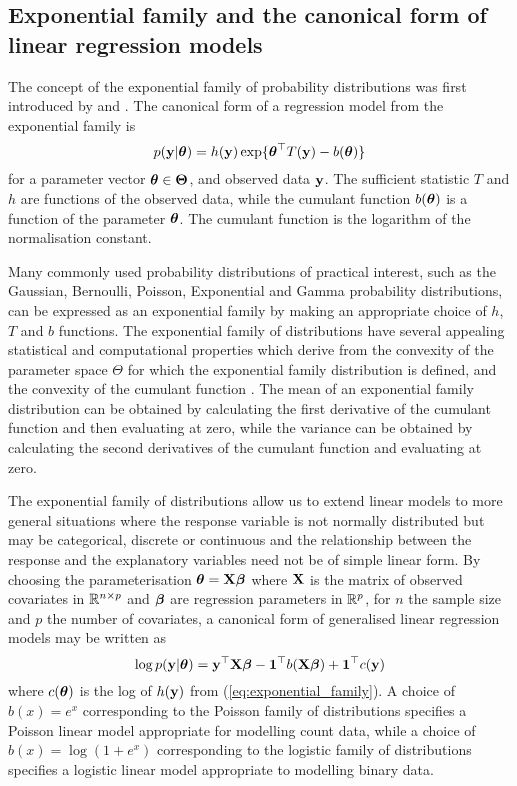 \subsection{Exponential family and the canonical form of linear regression
models}

The concept of the exponential family of probability distributions was first
introduced by \cite{Koopman1935} and \cite{pitman_1936}. The canonical form of a
regression model from the exponential family is
\begin{equation}\label{eq:exponential_family}
	p({\bf y} | {\boldsymbol \theta}) = h({\bf y}) \exp \{ {\boldsymbol \theta}^\top T({\bf y}) - b({\boldsymbol \theta}) \}
\end{equation}
for a parameter vector ${\boldsymbol \theta} \in \mathbf{\Theta}$, and observed data ${\bf y}$.
The sufficient statistic $T$ and $h$ are functions of the observed data, while
the cumulant function $b({\boldsymbol \theta})$ is a function of the parameter ${\boldsymbol \theta}$. The
cumulant function is the logarithm of the normalisation constant.

Many commonly used probability distributions of practical interest, such as the
Gaussian, Bernoulli, Poisson, Exponential and Gamma probability distributions,
can be expressed as an exponential family by making an appropriate choice of
$h$, $T$ and $b$ functions. The exponential family of distributions have several
appealing statistical and computational properties which derive from the
convexity of the parameter space $\Theta$ for which the exponential family
distribution is defined, and the convexity of the cumulant function
\cite{Jordan2010}. The mean of an exponential family distribution can be
obtained by calculating the first derivative of the cumulant function and then
evaluating at zero, while the variance can be obtained by calculating the second
derivatives of the cumulant function and evaluating at zero.

The exponential family of distributions allow us to extend linear models to more
general situations where the response variable is not normally distributed but
may be categorical, discrete or continuous and the relationship between the
response and the explanatory variables need not be of simple linear form.  By
choosing the parameterisation ${\boldsymbol \theta} = {\bf X} {\boldsymbol \beta}$ where ${\bf X}$ is the matrix
of observed covariates in ${\mathbb{R}}^{n \times p}$ and ${\boldsymbol \beta}$ are regression
parameters in ${\mathbb{R}}^p$, for $n$ the sample size and $p$ the number of covariates,
a canonical form of generalised linear regression models may be written as
\begin{equation}\label{eq:glm}
	\log p({\bf y} | {\boldsymbol \theta}) = {\bf y}^\top {\bf X} {\boldsymbol\beta} - {\bf 1}^\top b({\bf X} {\boldsymbol \beta}) + {\bf 1}^\top c({\bf y})
\end{equation}
where $c({\boldsymbol \theta})$ is the log of $h({\bf y})$ from 
(\ref{eq:exponential_family}). A choice of $b(x) = e^x$ corresponding to the
Poisson family of distributions specifies a Poisson linear model appropriate for
modelling count data, while a choice of $b(x) = \log(1 + e^x)$ corresponding to
the logistic family of distributions specifies a logistic linear model
appropriate to modelling binary data.

